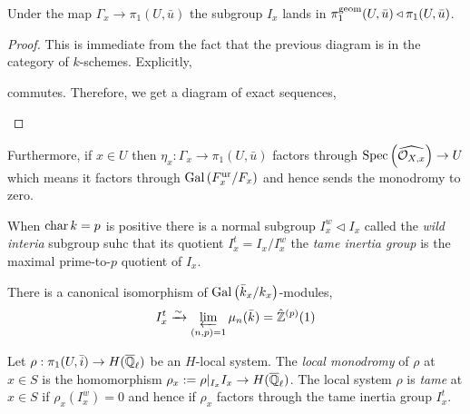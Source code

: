 \documentclass[12pt]{article}
\begin{document}
\begin{prop}
Under the map $\Gamma_x \to \pi_1(U, \bar{u})$ the subgroup $I_x$ lands in $\pi_1^{\mathrm{geom}}(U, \bar{u}) \triangleleft \pi_1(U, \bar{u})$.
\end{prop}

\begin{proof}
This is immediate from the fact that the previous diagram is in the category of $k$-schemes. Explicitly, 
\begin{center}
\end{center}
commutes. Therefore, we get a diagram of exact sequences,
\begin{center}
\end{center} 
\end{proof}

\begin{rmk}
Furthermore, if $x \in U$ then $\eta_x : \Gamma_x \to \pi_1(U, \bar{u})$ factors through $\mathrm{Spec}\left( \widehat{\mathcal{O}_{X, x}} \right) \to U$ which means it factors through $\mathrm{Gal}\left( F^{\mathrm{ur}}_x/F_x \right)$ and hence sends the monodromy to zero. 
\end{rmk}

\begin{defn}
When $\operatorname{\mathrm{char}}{k} = p$ is positive there is a normal subgroup $I^w_x \triangleleft I_x$ called the \textit{wild interia} subgroup suhc that its quotient $I_x^t = I_x / I_x^w$ the \textit{tame inertia group} is the maximal prime-to-$p$ quotient of $I_x$. 
\end{defn}

\begin{prop}
There is a canonical isomorphism of $\mathrm{Gal}\left( \bar{k}_x / k_x \right)$-modules,
\[ I^t_x \xrightarrow{\sim} \varprojlim_{(n,p) = 1} \mu_n(\bar{k}) = \hat{\mathbb{Z}}^{(p)}(1) \]
\end{prop}

\begin{defn}
Let $\rho : \pi_1(U, \bar{i}) \to H(\overline{\mathbb{Q}}_\ell)$ be an $H$-local system. The \textit{local monodromy} of $\rho$ at $x \in S$ is the homomorphism $\rho_x := \rho|_{I_x}  I_x \to H(\overline{\mathbb{Q}}_\ell)$. The local system $\rho$ is \textit{tame} at $x \in S$ if $\rho_x(I_x^w) = 0$ and hence if $\rho_x$ factors through the tame inertia group $I^t_x$. 
\end{defn}
\end{document}
